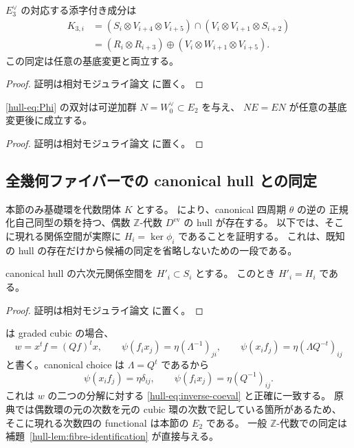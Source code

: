 \begin{lemma}[普遍的な次数三分解]
\label{hull-lem:K3}
$E_3^{\vee}$ の対応する添字付き成分は
\begin{align*}
 K_{3,i}
 &= (S_i\otimes V_{i+4}\otimes V_{i+5})
       \cap(V_i\otimes V_{i+1}\otimes S_{i+2})\\
 &= (R_i\otimes R_{i+3})
       \oplus(V_i\otimes W_{i+1}\otimes V_{i+5}).
 \tag{UH-10}\label{hull-eq:K3}
\end{align*}
この同定は任意の基底変更と両立する。
\end{lemma}
\begin{proof}
証明は相対モジュライ論文 \cite[\texttt{universal_cubic_hull}]{QuadricModuli2026} に置く。
\end{proof}

\begin{lemma}
\label{hull-lem:normal}
\eqref{hull-eq:Phi} の双対は可逆加群 $N=W_0^{\vee}\subset E_2$ を与え、
$NE=EN$ が任意の基底変更後に成立する。
\end{lemma}
\begin{proof}
証明は相対モジュライ論文 \cite[\texttt{universal_cubic_hull}]{QuadricModuli2026} に置く。
\end{proof}

\subsection{全幾何ファイバーでの canonical hull との同定}

本節のみ基礎環を代数閉体 $K$ とする。
\cite[Theorem 6.1]{VdB2011} により、canonical 四周期 $\theta$ の逆の
正規化自己同型の類を持つ、偶数 $\mathbb Z$-代数 $D^{\mathrm{ev}}$ の hull が存在する。
以下では、そこに現れる関係空間が実際に $H_i=\ker\phi_i$ であることを証明する。
これは、既知の hull の存在だけから候補の同定を省略しないための一段である。

\begin{lemma}[正規化式が決める評価の一意性]
\label{hull-lem:fibre-identification}
canonical hull の六次元関係空間を $H'_i\subset S_i$ とする。
このとき $H'_i=H_i$ である。
\end{lemma}
\begin{proof}
証明は相対モジュライ論文 \cite[\texttt{universal_cubic_hull}]{QuadricModuli2026} に置く。
\end{proof}

\begin{remark}
\cite[Proposition 2.7, (2.11), Remark 3.3]{BauwensVanDenBergh1998} は graded cubic の場合、
\[
 w=x^tf=(Qf)^tx,\qquad
 \psi(f_i x_j)=\eta(\Lambda^{-1})_{ji},\qquad
 \psi(x_i f_j)=\eta(\Lambda Q^{-t})_{ij}
\]
と書く。canonical choice は $\Lambda=Q^t$ であるから
\[
 \psi(x_i f_j)=\eta\delta_{ij},\qquad
 \psi(f_i x_j)=\eta(Q^{-1})_{ij}.
 \tag{UH-15}\label{hull-eq:BV-convention}
\]
これは $w$ の二つの分解に対する \eqref{hull-eq:inverse-coeval} と正確に一致する。
原典では偶数環の元の次数を元の cubic 環の次数で記している箇所があるため、
そこに現れる次数四の functional は本節の $E_2$ である。
一般 $\mathbb Z$-代数での同定は補題~\ref{hull-lem:fibre-identification} が直接与える。
\end{remark}

